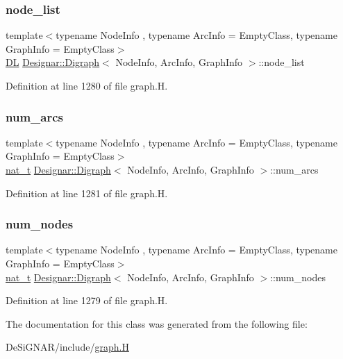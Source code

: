 \subsubsection{\texorpdfstring{node\+\_\+list}{node\_list}}
{\footnotesize\ttfamily template$<$typename Node\+Info , typename Arc\+Info  = Empty\+Class, typename Graph\+Info  = Empty\+Class$>$ \\
\hyperlink{class_designar_1_1_d_l}{DL} \hyperlink{class_designar_1_1_digraph}{Designar\+::\+Digraph}$<$ Node\+Info, Arc\+Info, Graph\+Info $>$\+::node\+\_\+list\hspace{0.3cm}{\ttfamily [protected]}}



Definition at line 1280 of file graph.\+H.

\mbox{\label{class_designar_1_1_digraph_accd2da6bdb5bc0624e7f79c904c89328}} 
\subsubsection{\texorpdfstring{num\+\_\+arcs}{num\_arcs}}
{\footnotesize\ttfamily template$<$typename Node\+Info , typename Arc\+Info  = Empty\+Class, typename Graph\+Info  = Empty\+Class$>$ \\
\hyperlink{namespace_designar_aa72662848b9f4815e7bf31a7cf3e33d1}{nat\+\_\+t} \hyperlink{class_designar_1_1_digraph}{Designar\+::\+Digraph}$<$ Node\+Info, Arc\+Info, Graph\+Info $>$\+::num\+\_\+arcs\hspace{0.3cm}{\ttfamily [protected]}}



Definition at line 1281 of file graph.\+H.

\mbox{\label{class_designar_1_1_digraph_a468cec4048ff9042a288dca47ad856aa}} 
\subsubsection{\texorpdfstring{num\+\_\+nodes}{num\_nodes}}
{\footnotesize\ttfamily template$<$typename Node\+Info , typename Arc\+Info  = Empty\+Class, typename Graph\+Info  = Empty\+Class$>$ \\
\hyperlink{namespace_designar_aa72662848b9f4815e7bf31a7cf3e33d1}{nat\+\_\+t} \hyperlink{class_designar_1_1_digraph}{Designar\+::\+Digraph}$<$ Node\+Info, Arc\+Info, Graph\+Info $>$\+::num\+\_\+nodes\hspace{0.3cm}{\ttfamily [protected]}}



Definition at line 1279 of file graph.\+H.



The documentation for this class was generated from the following file\+:\begin{DoxyCompactItemize}
\item 
De\+Si\+G\+N\+A\+R/include/\hyperlink{graph_8_h}{graph.\+H}\end{DoxyCompactItemize}
